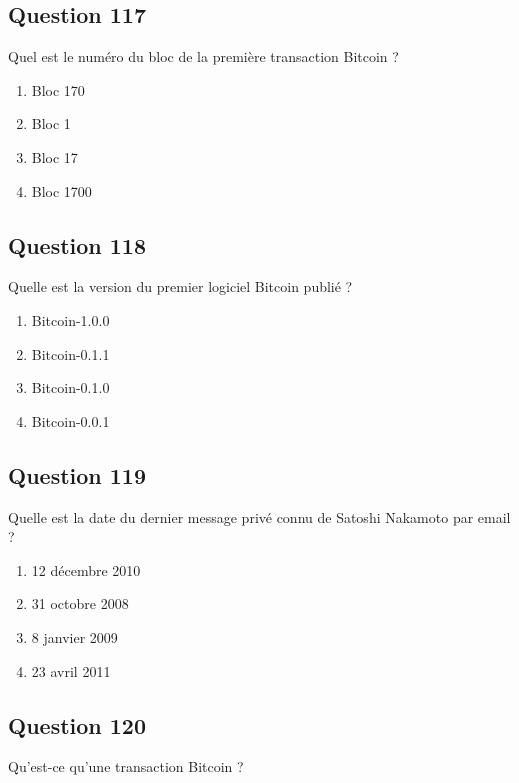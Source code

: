 \documentclass[12pt,a4paper]{article}
\begin{document}
\bigskip


\subsection*{Question 117}
Quel est le numéro du bloc de la première transaction Bitcoin ?

\begin{enumerate}[label=\Alph*., leftmargin=*]
\item Bloc 170
\item Bloc 1
\item Bloc 17
\item Bloc 1700
\end{enumerate}

\bigskip


\subsection*{Question 118}
Quelle est la version du premier logiciel Bitcoin publié ?

\begin{enumerate}[label=\Alph*., leftmargin=*]
\item Bitcoin-1.0.0
\item Bitcoin-0.1.1
\item Bitcoin-0.1.0
\item Bitcoin-0.0.1
\end{enumerate}

\bigskip


\subsection*{Question 119}
Quelle est la date du dernier message privé connu de Satoshi Nakamoto par email ?

\begin{enumerate}[label=\Alph*., leftmargin=*]
\item 12 décembre 2010
\item 31 octobre 2008
\item 8 janvier 2009
\item 23 avril 2011
\end{enumerate}

\bigskip


\subsection*{Question 120}
Qu'est-ce qu'une transaction Bitcoin ?
\end{document}
